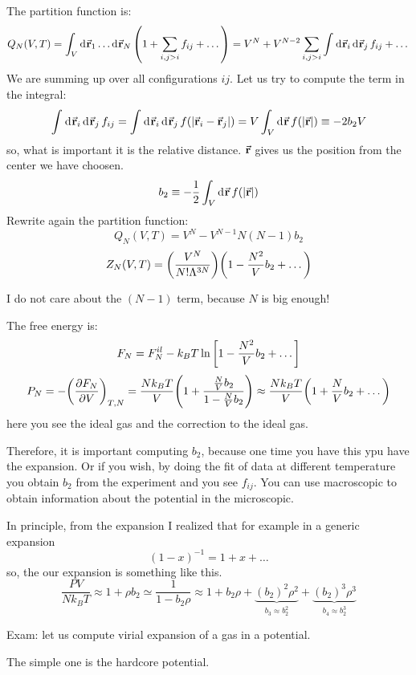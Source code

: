 \documentclass[../main/main.tex]{subfiles}
\begin{document}
The partition function is:
\begin{equation}
  Q_N (V,T) = \int_{V}^{} \dd[]{\va{r}_1} \dots \dd[]{\va{r}_N} \qty(1+ \sum_{i,j>i}^{} f_{ij} + \dots ) = V^N + V^{N-2} \sum_{i,j>i}^{} \int_{}^{} \dd[]{\va{r}_i} \dd[]{\va{r}_j} f_{ij} + \dots
\end{equation}
We are summing up over all configurations \( ij \).
Let us try to compute the term in the integral:
\begin{equation}
  \int_{}^{} \dd[]{\va{r}_i} \dd[]{\va{r}_j} f_{ij} = \int_{}^{} \dd[]{\va{r}_i} \dd[]{\va{r}_j} f \qty(\abs{\va{r}_i - \va{r}_j} )
  = V \int_{V}^{} \dd[]{\va{r}}  f \qty(\abs{\va{r}} ) \equiv -2 b_2 V
\end{equation}
so, what is important it is the relative distance. \( \va{r} \) gives us the position from the center we have choosen.
\begin{equation}
  b_2 \equiv - \frac{1}{2} \int_{V}^{} \dd[]{\va{r}}  f \qty(\abs{\va{r}} )
\end{equation}
Rewrite again the partition function:
\begin{equation}
  Q_N (V,T) = V^N - V^{N-1} N (N-1) b_2
\end{equation}
\begin{equation}
  Z_N (V,T) = \qty(\frac{V^N}{N! \Lambda ^{3N}}) \qty(1- \frac{N^2}{V}b_2 + \dots)
\end{equation}
\begin{remark}
I do not care about the \( (N-1) \) term, because \( N \) is big enough!
\end{remark}
The free energy is:
\begin{equation}
  F_N = F_N^{il} - k_B T \ln{\qty[1-\frac{N^2}{V}b_2 + \dots] }
\end{equation}
\begin{equation}
  P_N = - \qty(\pdv{F_N}{V} )_{T,N} = \frac{N k_B T}{V} \qty(1+ \frac{\frac{N}{V}b_2}{1- \frac{N}{V}b_2})
  \approx \frac{N k_B T}{V} \qty(1+\frac{N}{V}b_2 + \dots)
\end{equation}
here you see the ideal gas and the correction to the ideal gas.

Therefore, it is important computing \( b_2 \), because one time you have this ypu have the expansion. Or if you wish, by doing the fit of data at different temperature you obtain \( b_2 \) from the experiment and you see \( f_{ij} \). You can use macroscopic to obtain information about the potential in the microscopic.

In principle, from the expansion I realized that for example in a generic expansion
\begin{equation}
  (1-x)^{-1} = 1 + x + \dots
\end{equation}
so, the our expansion is something like this.
\begin{equation}
  \frac{PV}{N k_B T} \approx 1 + \rho b_2 \simeq \frac{1}{1-b_2 \rho } \approx 1 + b_2 \rho + \underbrace{(b_2)^2 \rho ^2}_{b_3 \approx b_2^2}  + \underbrace{(b_2)^3 \rho ^3}_{b_4 \approx b_2^3}
\end{equation}
\begin{example}
Exam: let us compute virial expansion of a gas in a potential.
\end{example}
The simple one is the hardcore potential.
\end{document}
